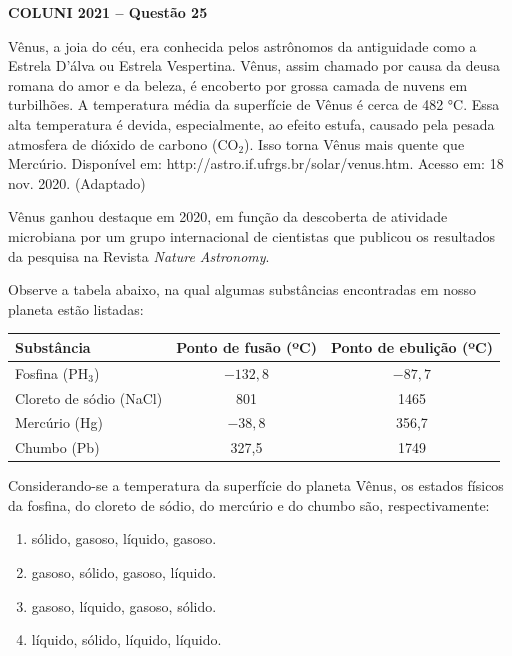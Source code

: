 \textbf{COLUNI 2021 -- Questão 25}\par\medskip Vênus, a joia do céu, era conhecida pelos astrônomos da antiguidade como a Estrela D'álva ou Estrela Vespertina. Vênus, assim chamado por causa da deusa romana do amor e da beleza, é encoberto por grossa camada de nuvens em turbilhões. A temperatura média da superfície de Vênus é cerca de 482 °C. Essa alta temperatura é devida, especialmente, ao efeito estufa, causado pela pesada atmosfera de dióxido de carbono (CO$_2$). Isso torna Vênus mais quente que Mercúrio. Disponível em: http://astro.if.ufrgs.br/solar/venus.htm. Acesso em: 18 nov. 2020. (Adaptado)

\par

Vênus ganhou destaque em 2020, em função da descoberta de atividade microbiana por um grupo internacional de cientistas que publicou os resultados da pesquisa na Revista \textit{Nature Astronomy}.

\par

Observe a tabela abaixo, na qual algumas substâncias encontradas em nosso planeta estão listadas:

\par

\begin{center}
\begin{tabular}{|l|c|c|}
\hline
\textbf{Substância} & \textbf{Ponto de fusão (ºC)} & \textbf{Ponto de ebulição (ºC)} \\
\hline
Fosfina (PH$_3$) & $-132{,}8$ & $-87{,}7$ \\
\hline
Cloreto de sódio (NaCl) & 801 & 1465 \\
\hline
Mercúrio (Hg) & $-38{,}8$ & 356{,}7 \\
\hline
Chumbo (Pb) & 327{,}5 & 1749 \\
\hline
\end{tabular}
\end{center}

\par

Considerando-se a temperatura da superfície do planeta Vênus, os estados físicos da fosfina, do cloreto de sódio, do mercúrio e do chumbo são, respectivamente:\begin{enumerate}
\item sólido, gasoso, líquido, gasoso.
\item gasoso, sólido, gasoso, líquido.
\item gasoso, líquido, gasoso, sólido.
\item líquido, sólido, líquido, líquido.\end{enumerate}
